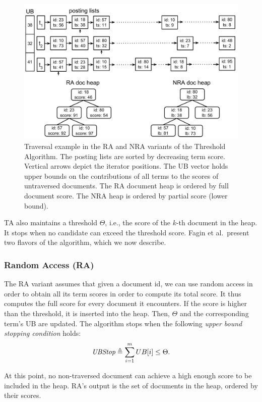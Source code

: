 \begin{figure}[tbh]
\centering
\includegraphics[width=.7\linewidth]{figures/postingsLists}
\caption{Traversal example in the RA and NRA variants of the Threshold Algorithm. The posting lists are sorted by decreasing term score. Vertical arrows depict the iterator positions. The UB vector holds upper bounds on the contributions of all terms to the scores of untraversed documents. The RA document heap is ordered by full document score. The NRA heap is ordered by partial score (lower bound).}
\label{fig:lists}
\end{figure}

TA also maintains a threshold $\Theta$, i.e., the score of the $k$-th document in the heap.
It stops when no candidate can exceed the threshold score. 
Fagin et al.\ present two flavors of the algorithm, which we now describe.

\subsubsection{Random Access (RA)} 
The RA variant assumes that given a document id, we can use random access in order to obtain all its term scores in order to compute its total score. It thus computes the full score for every document it encounters. If the score is higher than the threshold, it is inserted into the heap. Then, $\Theta$ and the corresponding term's UB are updated. The algorithm stops when 
the following \emph{upper bound stopping condition} holds:
\begin{equation} \label{eq:stop}
\textit{UBStop} \triangleq \sum_{i=1}^m UB[i] \le \Theta.
\end{equation}

At this point, no non-traversed document can achieve a high enough score to be included in the heap. RA's output is the set of documents in the heap, ordered by their scores.

